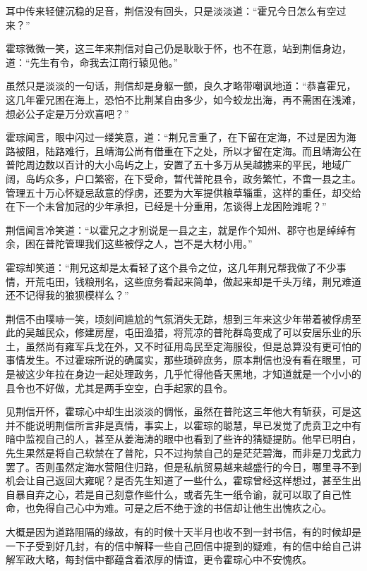 耳中传来轻健沉稳的足音，荆信没有回头，只是淡淡道：“霍兄今日怎么有空过来？”

霍琮微微一笑，这三年来荆信对自己仍是耿耿于怀，也不在意，站到荆信身边，道：“先生有令，命我去江南行辕见他。”

虽然只是淡淡的一句话，荆信却是身躯一颤，良久才略带嘲讽地道：“恭喜霍兄，这几年霍兄困在海上，恐怕不比荆某自由多少，如今蛟龙出海，再不需困在浅滩，想必公子定是万分欢喜吧？”

霍琮闻言，眼中闪过一缕笑意，道：“荆兄言重了，在下留在定海，不过是因为海路被阻，陆路难行，且靖海公尚有借重在下之处，所以才留在定海。而且靖海公在普陀周边数以百计的大小岛屿之上，安置了五十多万从吴越掳来的平民，地域广阔，岛屿众多，户口繁密，在下受命，暂代普陀县令，政务繁忙，不啻一县之主。管理五十万心怀疑忌敌意的俘虏，还要为大军提供粮草辎重，这样的重任，却交给在下一个未曾加冠的少年承担，已经是十分重用，怎谈得上龙困险滩呢？”

荆信闻言冷笑道：“以霍兄之才别说是一县之主，就是作个知州、郡守也是绰绰有余，困在普陀管理我们这些被俘之人，岂不是大材小用。”

霍琮却笑道：“荆兄这却是太看轻了这个县令之位，这几年荆兄帮我做了不少事情，开荒屯田，钱粮刑名，这些庶务看起来简单，做起来却是千头万绪，荆兄难道还不记得我的狼狈模样么？”

荆信不由噗哧一笑，顷刻间尴尬的气氛消失无踪，想到三年来这少年带着被俘虏至此的吴越民众，修建房屋，屯田渔猎，将荒凉的普陀群岛变成了可以安居乐业的乐土，虽然尚有雍军兵戈在外，又不时征用岛民至定海服役，但是总算没有更可怕的事情发生。不过霍琮所说的确属实，那些琐碎庶务，原本荆信也没有看在眼里，可是被这少年拉在身边一起处理政务，几乎忙得他昏天黑地，才知道就是一个小小的县令也不好做，尤其是两手空空，白手起家的县令。

见荆信开怀，霍琮心中却生出淡淡的惆怅，虽然在普陀这三年他大有斩获，可是这并不能说明荆信所言非是真情，事实上，以霍琮的聪慧，早已发觉了虎贲卫之中有暗中监视自己的人，甚至从姜海涛的眼中也看到了些许的猜疑提防。他早已明白，先生果然是将自己软禁在了普陀，只不过拘禁自己的是茫茫碧海，而非是刀戈武力罢了。否则虽然定海水营阻住归路，但是私航贸易越来越盛行的今日，哪里寻不到机会让自己返回大雍呢？是否先生知道了一些什么，霍琮曾经这样想过，甚至生出自暴自弃之心，若是自己刻意作些什么，或者先生一纸令谕，就可以取了自己性命，也免得自己心中为难。可是之后不绝于途的书信却让他生出愧疚之心。

大概是因为道路阻隔的缘故，有的时候十天半月也收不到一封书信，有的时候却是一下子受到好几封，有的信中解释一些自己回信中提到的疑难，有的信中给自己讲解军政大略，每封信中都蕴含着浓厚的情谊，更令霍琮心中不安愧疚。


